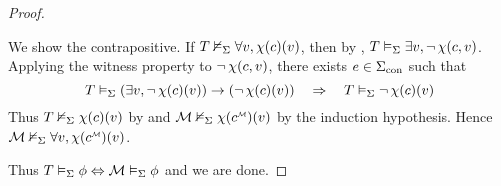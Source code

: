 \begin{proof}
\begin{itemize}
            \begin{backward}
                We show the contrapositive.
                If $T \nvDash_{\Sigma} \forall v, \chi(c) (v)$, 
                then by ,
                $T \vDash_{\Sigma} \exists v, \neg\, \chi(c,v)$.
                Applying the witness property to $\neg\, \chi(c,v)$,
                there exists $e \in {\Sigma}_\mathrm{con}$ such that 
                \[
                    T \vDash_{\Sigma} (\exists v, \neg\, \chi(c) (v)) \to 
                    (\neg\, \chi(c) (v))
                    \quad 
                    \Rightarrow
                    \quad T \vDash_{\Sigma} \neg\, \chi(c) (v)
                \]
                Thus $T \nvDash_{\Sigma} \chi(c) (v)$ by 
                and $\MM \nodel{\Si} \chi(\mmintp{c}) (v)$ 
                by the induction hypothesis.
                Hence $\MM \nodel{\Si} \forall v, \chi(\mmintp{c}) (v)$.
            \end{backward}
    \end{itemize}
    Thus $T \vDash_{\Sigma} \phi \Leftrightarrow \mathcal{M} \vDash_{\Sigma} \phi$ and we are done.
\end{proof}

